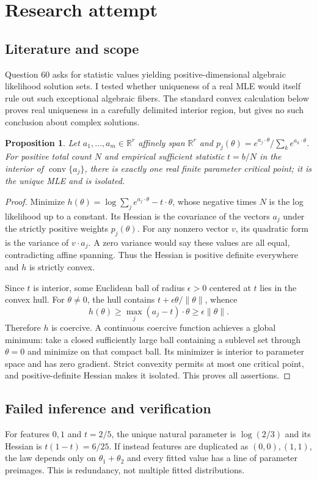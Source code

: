 \documentclass[11pt]{article}
\newtheorem{proposition}{Proposition}
\begin{document}
\section{Research attempt}
\subsection{Literature and scope}
Question 60 asks for statistic values yielding positive-dimensional algebraic likelihood solution sets. I tested whether uniqueness of a real MLE would itself rule out such exceptional algebraic fibers. The standard convex calculation below proves real uniqueness in a carefully delimited interior region, but gives no such conclusion about complex solutions.
\begin{proposition}
Let $a_1,\ldots,a_m\in\mathbb R^r$ affinely span $\mathbb R^r$ and $p_j(\theta)=e^{a_j\cdot\theta}/\sum_ke^{a_k\cdot\theta}$. For positive total count $N$ and empirical sufficient statistic $t=b/N$ in the interior of $\operatorname{conv}\{a_j\}$, there is exactly one real finite parameter critical point; it is the unique MLE and is isolated.
\end{proposition}
\begin{proof}
Minimize $h(\theta)=\log\sum_je^{a_j\cdot\theta}-t\cdot\theta$, whose negative times $N$ is the log likelihood up to a constant. Its Hessian is the covariance of the vectors $a_j$ under the strictly positive weights $p_j(\theta)$. For any nonzero vector $v$, its quadratic form is the variance of $v\cdot a_j$. A zero variance would say these values are all equal, contradicting affine spanning. Thus the Hessian is positive definite everywhere and $h$ is strictly convex.

Since $t$ is interior, some Euclidean ball of radius $\epsilon>0$ centered at $t$ lies in the convex hull. For $\theta\ne0$, the hull contains $t+\epsilon\theta/\|\theta\|$, whence
\[
h(\theta)\ge\max_j(a_j-t)\cdot\theta\ge\epsilon\|\theta\|.
\]
Therefore $h$ is coercive. A continuous coercive function achieves a global minimum: take a closed sufficiently large ball containing a sublevel set through $\theta=0$ and minimize on that compact ball. Its minimizer is interior to parameter space and has zero gradient. Strict convexity permits at most one critical point, and positive-definite Hessian makes it isolated. This proves all assertions.
\end{proof}
\subsection{Failed inference and verification}
For features $0,1$ and $t=2/5$, the unique natural parameter is $\log(2/3)$ and its Hessian is $t(1-t)=6/25$. If instead features are duplicated as $(0,0),(1,1)$, the law depends only on $\theta_1+\theta_2$ and every fitted value has a line of parameter preimages. This is redundancy, not multiple fitted distributions.
\end{document}
